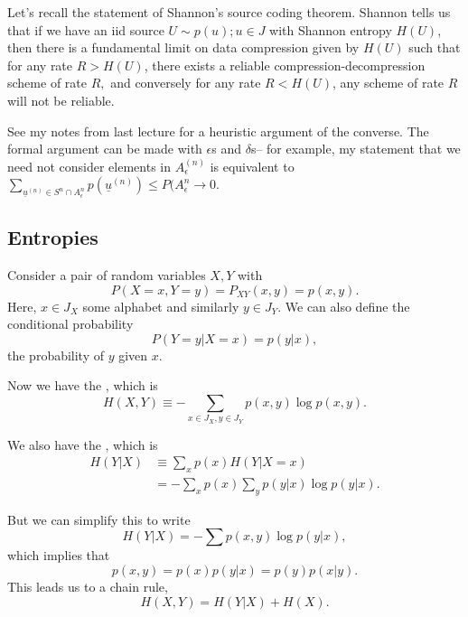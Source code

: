 Let's recall the statement of Shannon's source coding theorem. Shannon tells us that if we have an iid source $U\sim p(u); u\in J$ with Shannon entropy $H(U)$, then there is a fundamental limit on data compression given by $H(U)$ such that for any rate $R>H(U)$, there exists a reliable compression-decompression scheme of rate $R,$ and conversely for any rate $R<H(U)$, any scheme of rate $R$ will not be reliable.

See my notes from last lecture for a heuristic argument of the converse. The formal argument can be made with $\epsilon$s and $\delta$s-- for example, my statement that we need not consider elements in $A_\epsilon^{(n)}$ is equivalent to $\sum_{\underline{u}^{(n)}\in S^n \cap A_\epsilon^n} p(\underline{u}^{(n)}) \leq P(A_\epsilon^n \to 0$.

\subsection*{Entropies} Consider a pair of random variables $X,Y$ with 
\begin{equation}
    P(X=x,Y=y)=P_{XY}(x,y)=p(x,y).
\end{equation}
Here, $x\in J_X$ some alphabet and similarly $y\in J_Y$. We can also define the conditional probability
\begin{equation}
    P(Y=y|X=x)=p(y|x),
\end{equation}
the probability of $y$ given $x$.

\begin{defn}
    Now we have the , which is
    \begin{equation}
        H(X,Y)\equiv -\sum_{x\in J_X,y\in J_Y} p(x,y)\log p(x,y).
    \end{equation}
\end{defn}
\begin{defn}
    We also have the , which is
    \begin{align*}
        H(Y|X) &\equiv \sum_x p(x) H(Y|X=x)\\
        &= -\sum_x p(x) \sum_y p(y|x) \log p(y|x).
    \end{align*}
\end{defn}
But we can simplify this to write
\begin{equation}
    H(Y|X)=-\sum p(x,y) \log p(y|x),
\end{equation}
which implies that
\begin{equation}
    p(x,y)= p(x) p(y|x) = p(y)p(x|y).
\end{equation}
This leads us to a chain rule,
\begin{equation}
    H(X,Y)= H(Y|X) + H(X).
\end{equation}

